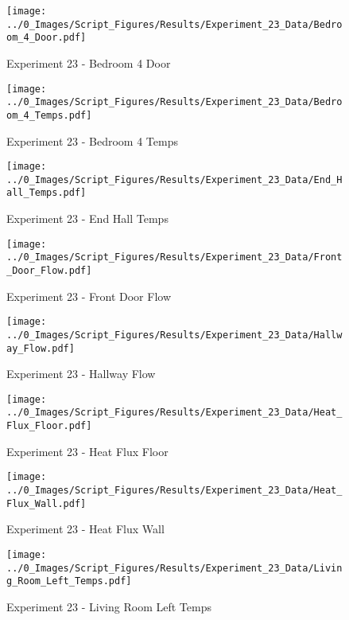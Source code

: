 	\clearpage

	\begin{figure}[H]
		\centering
		\texttt{[image: ../0\_Images/Script\_Figures/Results/Experiment\_23\_Data/Bedroom\_4\_Door.pdf]}
		\caption[]{Experiment 23 - Bedroom 4 Door}
	\end{figure}
 

	\begin{figure}[H]
		\centering
		\texttt{[image: ../0\_Images/Script\_Figures/Results/Experiment\_23\_Data/Bedroom\_4\_Temps.pdf]}
		\caption[]{Experiment 23 - Bedroom 4 Temps}
	\end{figure}
 
	\clearpage

	\begin{figure}[H]
		\centering
		\texttt{[image: ../0\_Images/Script\_Figures/Results/Experiment\_23\_Data/End\_Hall\_Temps.pdf]}
		\caption[]{Experiment 23 - End Hall Temps}
	\end{figure}
 

	\begin{figure}[H]
		\centering
		\texttt{[image: ../0\_Images/Script\_Figures/Results/Experiment\_23\_Data/Front\_Door\_Flow.pdf]}
		\caption[]{Experiment 23 - Front Door Flow}
	\end{figure}
 
	\clearpage

	\begin{figure}[H]
		\centering
		\texttt{[image: ../0\_Images/Script\_Figures/Results/Experiment\_23\_Data/Hallway\_Flow.pdf]}
		\caption[]{Experiment 23 - Hallway Flow}
	\end{figure}
 

	\begin{figure}[H]
		\centering
		\texttt{[image: ../0\_Images/Script\_Figures/Results/Experiment\_23\_Data/Heat\_Flux\_Floor.pdf]}
		\caption[]{Experiment 23 - Heat Flux Floor}
	\end{figure}
 
	\clearpage

	\begin{figure}[H]
		\centering
		\texttt{[image: ../0\_Images/Script\_Figures/Results/Experiment\_23\_Data/Heat\_Flux\_Wall.pdf]}
		\caption[]{Experiment 23 - Heat Flux Wall}
	\end{figure}
 

	\begin{figure}[H]
		\centering
		\texttt{[image: ../0\_Images/Script\_Figures/Results/Experiment\_23\_Data/Living\_Room\_Left\_Temps.pdf]}
		\caption[]{Experiment 23 - Living Room Left Temps}
	\end{figure}
 
